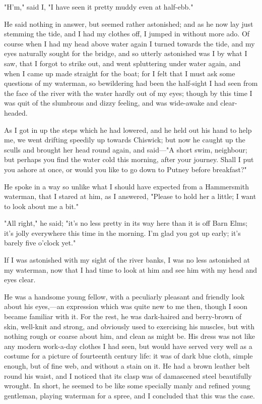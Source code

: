 "H'm," said I, "I have seen it pretty muddy even at half-ebb."

He said nothing in answer, but seemed rather astonished; and as he now
lay just stemming the tide, and I had my clothes off, I jumped in
without more ado. Of course when I had my head above water again I
turned towards the tide, and my eyes naturally sought for the bridge,
and so utterly astonished was I by what I saw, that I forgot to strike
out, and went spluttering under water again, and when I came up made
straight for the boat; for I felt that I must ask some questions of my
waterman, so bewildering had been the half-sight I had seen from the
face of the river with the water hardly out of my eyes; though by this
time I was quit of the slumbrous and dizzy feeling, and was wide-awake
and clear-headed.

As I got in up the steps which he had lowered, and he held out his hand
to help me, we went drifting speedily up towards Chiswick; but now he
caught up the sculls and brought her head round again, and said---"A
short swim, neighbour; but perhaps you find the water cold this morning,
after your journey. Shall I put you ashore at once, or would you like to
go down to Putney before breakfast?"

He spoke in a way so unlike what I should have expected from a
Hammersmith waterman, that I stared at him, as I answered, "Please to
hold her a little; I want to look about me a bit."

"All right," he said; "it's no less pretty in its way here than it is
off Barn Elms; it's jolly everywhere this time in the morning. I'm glad
you got up early; it's barely five o'clock yet."

If I was astonished with my sight of the river banks, I was no less
astonished at my waterman, now that I had time to look at him and see
him with my head and eyes clear.

He was a handsome young fellow, with a peculiarly pleasant and friendly
look about his eyes,---an expression which was quite new to me then,
though I soon became familiar with it. For the rest, he was dark-haired
and berry-brown of skin, well-knit and strong, and obviously used to
exercising his muscles, but with nothing rough or coarse about him, and
clean as might be. His dress was not like any modern work-a-day clothes
I had seen, but would have served very well as a costume for a picture
of fourteenth century life: it was of dark blue cloth, simple enough,
but of fine web, and without a stain on it. He had a brown leather belt
round his waist, and I noticed that its clasp was of damascened steel
beautifully wrought. In short, he seemed to be like some specially manly
and refined young gentleman, playing waterman for a spree, and I
concluded that this was the case.

